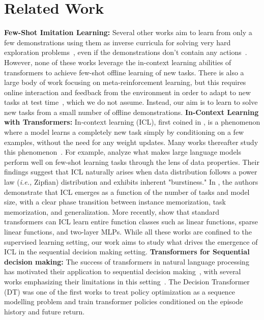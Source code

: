 \documentclass[]{fairmeta}
\newcommand{\ie}{\textit{i.e.,}}
\begin{document}
\section{Related Work}
\label{sec:rel_works}
\textbf{Few-Shot Imitation Learning:}
 Several other works aim to learn from only a few demonstrations using them as inverse curricula for solving very hard exploration problems~\citep{duan2016rl,james2018task,jang2022bc,mandi2022towards}, even if the demonstrations don't contain any actions~\citep{resnick2018backplay,salimans2018learning}. However, none of these works leverage the in-context learning abilities of transformers to achieve few-shot offline learning of new tasks. There is also a large body of work focusing on meta-reinforcement learning, but this requires online interaction and feedback from the environment in order to adapt to new tasks at test time~\citep{schmidhuber1987evolutionary,duan2016rl,finn2017model,pong2022offline, mitchell2021offline,beck2023survey}, which we do not assume. Instead, our aim is to learn to solve new tasks from a small number of offline demonstrations.
\textbf{In-Context Learning with Transformers:}
In-context learning (ICL), first coined in \citep{gpt3}, is a phenomenon where a model learns a completely new task simply by conditioning on a few examples, without the need for any weight updates. Many works thereafter study this phenomenon~\citep{von2022transformers,chan2022transformers,akyurek2022learning,olsson2022context,hahn2023theory,xie2021explanation,dai2022can}. For example, \citep{zipfian_icl} analyze what makes large language models perform well on few-shot learning tasks through the lens of data properties. Their findings suggest that ICL naturally arises when data distribution follows a power law (\ie{} Zipfian) distribution and exhibits inherent "burstiness."  In \cite{kirsch2022generalpurpose}, the authors demonstrate that ICL emerges as a function of the number of tasks and model size, with a clear phase transition between instance memorization, task memorization, and generalization. More recently, \cite{functionclass} show that standard transformers can ICL learn entire function classes such as linear functions, sparse linear functions, and two-layer MLPs. While all these works are confined to the supervised learning setting, our work aims to study what drives the emergence of ICL in the sequential decision making setting.
\textbf{Transformers for Sequential decision making:}
The success of transformers in natural language processing \citep{transformers} has motivated their application to sequential decision making~\citep{raileanu2020fast,trajectory_transformer,reid2022can,ajay2022conditional,correia2022hierarchical,yamagata2022q,melo2022transformers,reed2022generalist,zheng2022online,chen2022transdreamer,S3M, ryoo2022token,lincontextual,sun2023smart,hu2023decision,xu2023hyper,sudhakaran2023skill}, with several works emphasizing their limitations in this setting~\citep{brandfonbrener2022does,paster2022you,siebenborn2022crucial}. The Decision Transformer (DT) \citep{decision_transformer} was one of the first works to treat policy optimization as a sequence modelling problem and train transformer policies conditioned on the episode history and future return.
\end{document}
